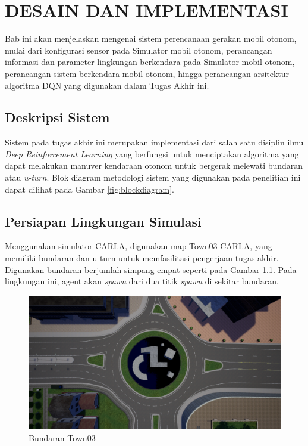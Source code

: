 \chapter{DESAIN DAN IMPLEMENTASI}
\label{chap:desainimplementasi}

Bab ini akan menjelaskan mengenai sistem perencanaan gerakan mobil otonom, mulai dari konfigurasi sensor pada Simulator mobil otonom, perancangan informasi dan parameter lingkungan berkendara pada Simulator mobil otonom, perancangan sistem berkendara mobil otonom, hingga perancangan arsitektur algoritma DQN yang digunakan dalam Tugas Akhir ini.


\section{Deskripsi Sistem}
\label{sec:deskripsisistem}

Sistem pada tugas akhir ini merupakan implementasi dari salah satu disiplin ilmu \textit{Deep Reinforcement Learning} yang berfungsi untuk menciptakan algoritma yang dapat melakukan manuver kendaraan otonom untuk bergerak melewati bundaran atau \textit{u-turn}. Blok diagram metodologi sistem yang digunakan pada penelitian ini dapat dilihat pada Gambar \ref{fig:blockdiagram}.

\section{Persiapan Lingkungan Simulasi}
\label{sec:simulasi}
Menggunakan simulator CARLA, digunakan map Town03 CARLA, yang memiliki bundaran dan u-turn untuk memfasilitasi pengerjaan tugas akhir. Digunakan bundaran berjumlah simpang empat seperti pada Gambar  \ref{fig:bundaran_town03}. Pada lingkungan ini, agent akan \textit{spawn }dari dua titik \textit{spawn} di sekitar bundaran.
\begin{figure}[H] 
	\centering
	\includegraphics[width=.7\linewidth]{images/bundaran}
	\caption{Bundaran Town03}
	\label{fig:bundaran_town03}
\end{figure}

